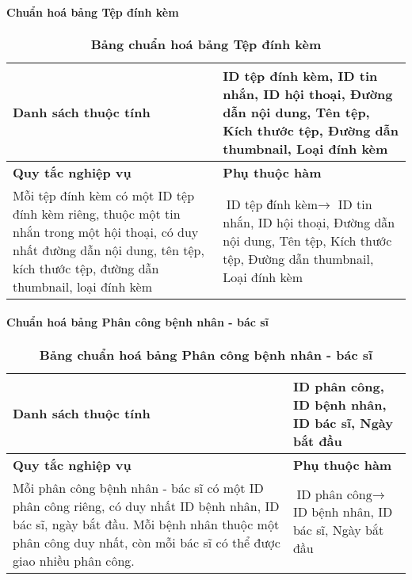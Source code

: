 \paragraph{Chuẩn hoá bảng Tệp đính kèm}
\mbox{}
\begin{table}[H]
  \caption{\bfseries \fontsize{12pt}{0pt}\selectfont Bảng chuẩn hoá bảng Tệp đính kèm}
  \centering
  \begin{tabularx}{0.9\textwidth}{|X|X|}
    \hline
    \textbf{Danh sách thuộc tính} & ID tệp đính kèm, ID tin nhắn, ID hội thoại, Đường dẫn nội
    dung, Tên tệp, Kích thước tệp, Đường dẫn thumbnail, Loại đính kèm \\
    \hline
    \textbf{Quy tắc nghiệp vụ} & \textbf{Phụ thuộc hàm} \\
    \hline
    Mỗi tệp đính kèm có một ID tệp đính kèm riêng, thuộc một tin nhắn trong một hội thoại, có duy nhất đường dẫn nội
    dung, tên tệp, kích thước tệp, đường dẫn thumbnail, loại đính kèm
    & \parbox[t]{\linewidth}{$\text{ID tệp đính kèm} \rightarrow$ ID tin nhắn, ID hội thoại, Đường dẫn nội
    dung, Tên tệp, Kích thước tệp, Đường dẫn thumbnail, Loại đính kèm} \\
    \hline
     \\
     \\
    \hline
  \end{tabularx}
\end{table}

\paragraph{Chuẩn hoá bảng Phân công bệnh nhân - bác sĩ}
\mbox{}
\begin{table}[H]
  \caption{\bfseries \fontsize{12pt}{0pt}\selectfont Bảng chuẩn hoá bảng Phân công bệnh nhân - bác sĩ}
  \centering
  \begin{tabularx}{0.9\textwidth}{|X|X|}
    \hline
    \textbf{Danh sách thuộc tính} & ID phân công, ID bệnh nhân, ID bác sĩ, Ngày bắt đầu \\
    \hline
    \textbf{Quy tắc nghiệp vụ} & \textbf{Phụ thuộc hàm} \\
    \hline
    Mỗi phân công bệnh nhân - bác sĩ có một ID phân công riêng, có duy nhất ID bệnh nhân, ID bác sĩ, ngày bắt đầu.
    Mỗi bệnh nhân thuộc một phân công duy nhất, còn mỗi bác sĩ có thể được giao nhiều phân công.
    & \parbox[t]{\linewidth}{$\text{ID phân công} \rightarrow$ ID bệnh nhân, ID bác sĩ, Ngày bắt đầu} \\
    \hline
     \\
     \\
    \hline
  \end{tabularx}
\end{table}

